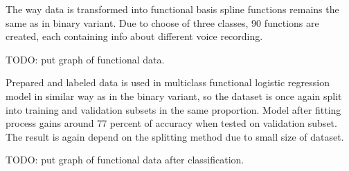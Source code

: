 \documentclass[energies,article,submit,pdftex,moreauthors]{Definitions/mdpi}
\begin{document}
The way data is transformed into functional basis spline functions remains the same as in binary variant. Due to choose of three classes, 90 functions are created, each containing info about different voice recording. 

\vspace{5mm}
TODO: put graph of functional data.
\vspace{5mm}

Prepared and labeled data is used in multiclass functional logistic regression model in similar way as in the binary variant, so the dataset is once again split into training and validation subsets in the same proportion. Model after fitting process gains around 77 percent of accuracy when tested on validation subset. The result is again depend on the splitting method due to small size of dataset.

\vspace{5mm}
TODO: put graph of functional data after classification.
\vspace{5mm}






\end{document}
